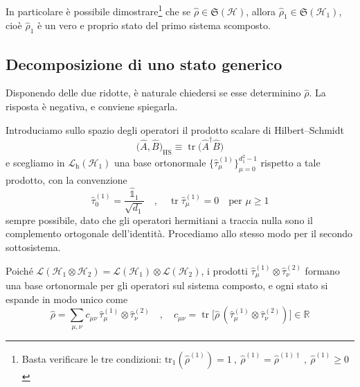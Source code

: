 In particolare è possibile dimostrare\footnote{Basta verificare le tre condizioni: $\text{tr}_1(\hat{\rho}^{(1)}) = 1 \ , \ \hat{\rho}^{(1)} = \hat{\rho}^{(1)\dagger} \ , \ \hat{\rho}^{(1)} \geq 0$} che se $\hat{\rho} \in \mathfrak{S}(\mathcal{H})$, allora $\hat{\rho}_1 \in \mathfrak{S}(\mathcal{H}_1)$, cioè $\hat{\rho}_1$ è un vero e proprio stato del primo sistema scomposto. 

\subsection{Decomposizione di uno stato generico}

Disponendo delle due ridotte, è naturale chiedersi se esse determinino $\hat{\rho}$. La risposta è negativa, e conviene spiegarla. 

Introduciamo sullo spazio degli operatori il prodotto scalare di Hilbert--Schmidt
%
\begin{equation}
    \bigl( \hat{A}, \hat{B} \bigr)_{\mathrm{HS}} \equiv
    \operatorname{tr} \bigl( \hat{A}^\dagger \hat{B} \bigr)
    \label{eq:hilbert-schmidt}
\end{equation}
%
e scegliamo in $\mathcal{L}_{\mathrm{h}}(\mathcal{H}_1)$ una base ortonormale $\{\hat{\tau}^{(1)}_\mu\}_{\mu = 0}^{d_1^2 - 1}$ rispetto a tale prodotto, con la convenzione
%
\begin{equation}
    \hat{\tau}^{(1)}_0 = \frac{\hat{\mathds{1}}_1}{\sqrt{d_1}} \quad , \quad \operatorname{tr} \hat{\tau}^{(1)}_\mu = 0 \quad \text{per } \mu \geq 1
    \label{eq:base-operatori}
\end{equation}
%
sempre possibile, dato che gli operatori hermitiani a traccia nulla sono il complemento ortogonale dell'identità. Procediamo allo stesso modo per il secondo sottosistema.

Poiché $\mathcal{L}(\mathcal{H}_1 \otimes \mathcal{H}_2) = \mathcal{L}(\mathcal{H}_1) \otimes \mathcal{L}(\mathcal{H}_2)$, i prodotti $\hat{\tau}^{(1)}_\mu \otimes \hat{\tau}^{(2)}_\nu$ formano una base ortonormale per gli operatori sul sistema composto, e ogni stato si espande in modo unico come
%
\begin{equation}
    \hat{\rho} = \sum_{\mu, \nu} c_{\mu\nu} \, \hat{\tau}^{(1)}_\mu \otimes \hat{\tau}^{(2)}_\nu \quad , \quad c_{\mu\nu} = \operatorname{tr} \bigl[ \hat{\rho} \, ( \hat{\tau}^{(1)}_\mu \otimes \hat{\tau}^{(2)}_\nu ) \bigr] \in \mathbb{R}
    \label{eq:espansione-rho}
\end{equation}

